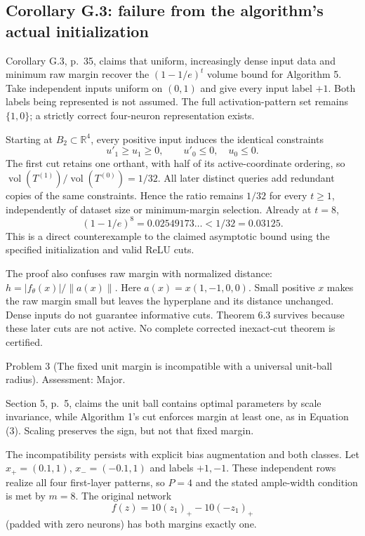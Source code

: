 \documentclass[10pt]{article}
\begin{document}
\subsection*{Corollary G.3: failure from the algorithm’s actual initialization}
Corollary G.3, p. 35, claims that uniform, increasingly dense input data and minimum raw margin recover the \((1-1/e)^t\) volume bound for Algorithm 5. Take independent inputs uniform on \((0,1)\) and give every input label \(+1\). Both labels being represented is not assumed. The full activation-pattern set remains \(\{1,0\}\); a strictly correct four-neuron representation exists.\par
Starting at \(B_2\subset\mathbb R^4\), every positive input induces the identical constraints \[u'_1\ge u_1\ge0,\qquad u'_0\le0,\quad u_0\le0.\] The first cut retains one orthant, with half of its active-coordinate ordering, so \(\operatorname{vol}(T^{(1)})/\operatorname{vol}(T^{(0)})=1/32\). All later distinct queries add redundant copies of the same constraints. Hence the ratio remains \(1/32\) for every \(t\ge1\), independently of dataset size or minimum-margin selection. Already at \(t=8\), \[(1-1/e)^8=0.02549173\ldots < 1/32=0.03125.\] This is a direct counterexample to the claimed asymptotic bound using the specified initialization and valid ReLU cuts.\par
The proof also confuses raw margin with normalized distance: \(h=|f_\theta(x)|/\|a(x)\|\). Here \(a(x)=x(1,-1,0,0)\). Small positive \(x\) makes the raw margin small but leaves the hyperplane and its distance unchanged. Dense inputs do not guarantee informative cuts. Theorem 6.3 survives because these later cuts are not active. No complete corrected inexact-cut theorem is certified.\par
Problem 3 (The fixed unit margin is incompatible with a universal unit-ball radius).  Assessment: Major.\par
Section 5, p. 5, claims the unit ball contains optimal parameters by scale invariance, while Algorithm 1’s cut enforces margin at least one, as in Equation (3). Scaling preserves the sign, but not that fixed margin.\par
The incompatibility persists with explicit bias augmentation and both classes. Let \(x_+=(0.1,1)\), \(x_-=(-0.1,1)\) and labels \(+1,-1\). These independent rows realize all four first-layer patterns, so \(P=4\) and the stated ample-width condition is met by \(m=8\). The original network \[f(z)=10(z_1)_+-10(-z_1)_+\] (padded with zero neurons) has both margins exactly one.\par
\end{document}
